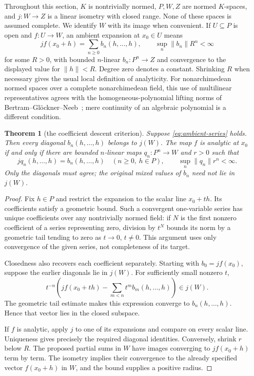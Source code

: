 \documentclass[11pt]{amsart}
\newtheorem{theorem}{Theorem}[section]
\theoremstyle{definition}
\theoremstyle{remark}
\numberwithin{equation}{section}
\newcommand{\norm}[1]{\lVert #1\rVert}
\begin{document}
Throughout this section, $K$ is nontrivially normed, $P,W,Z$ are normed $K$-spaces, and $j\colon W\to Z$ is a linear isometry with closed range. None of these spaces is assumed complete. We identify $W$ with its image when convenient. If $U\subseteq P$ is open and $f\colon U\to W$, an ambient expansion at $x_0\in U$ means
\begin{equation}\label{eq:ambient-series}
 jf(x_0+h)=\sum_{n\ge0}b_n(h,\ldots,h),\qquad
 \sup_n\norm{b_n}R^n<\infty
\end{equation}
for some $R>0$, with bounded $n$-linear $b_n\colon P^n\to Z$ and convergence to the displayed value for $\norm h<R$. Degree zero denotes a constant. Shrinking $R$ when necessary gives the usual local definition of analyticity. For nonarchimedean normed spaces over a complete nonarchimedean field, this use of multilinear representatives agrees with the homogeneous-polynomial lifting norms of Bertram--Gl\"ockner--Neeb~\cite[7.14--7.19]{BGN}; mere continuity of an algebraic polynomial is a different condition.

\begin{theorem}[the coefficient descent criterion]\label{thm:coefficient-descent}
Suppose \eqref{eq:ambient-series} holds. Then every diagonal $b_n(h,\ldots,h)$ belongs to $j(W)$. The map $f$ is analytic at $x_0$ if and only if there are bounded $n$-linear maps $q_n\colon P^n\to W$ and $r>0$ such that
\[
 jq_n(h,\ldots,h)=b_n(h,\ldots,h)\quad(n\ge0,\ h\in P),
 \qquad \sup_n\norm{q_n}r^n<\infty.
\]
Only the diagonals must agree; the original mixed values of $b_n$ need not lie in $j(W)$.
\end{theorem}

\begin{proof}
Fix $h\in P$ and restrict the expansion to the scalar line $x_0+th$. Its coefficients satisfy a geometric bound. Such a convergent one-variable series has unique coefficients over any nontrivially normed field: if $N$ is the first nonzero coefficient of a series representing zero, division by $t^N$ bounds its norm by a geometric tail tending to zero as $t\to0$, $t\ne0$. This argument uses only convergence of the given series, not completeness of its target.

Closedness also recovers each coefficient separately. Starting with $b_0=jf(x_0)$, suppose the earlier diagonals lie in $j(W)$. For sufficiently small nonzero $t$,
\[
 t^{-n}\left(jf(x_0+th)-\sum_{m<n}t^m b_m(h,\ldots,h)\right)\in j(W).
\]
The geometric tail estimate makes this expression converge to $b_n(h,\ldots,h)$. Hence that vector lies in the closed subspace.

If $f$ is analytic, apply $j$ to one of its expansions and compare on every scalar line. Uniqueness gives precisely the required diagonal identities. Conversely, shrink $r$ below $R$. The proposed partial sums in $W$ have images converging to $jf(x_0+h)$ term by term. The isometry implies their convergence to the already specified vector $f(x_0+h)$ in $W$, and the bound supplies a positive radius.
\end{proof}
\end{document}
